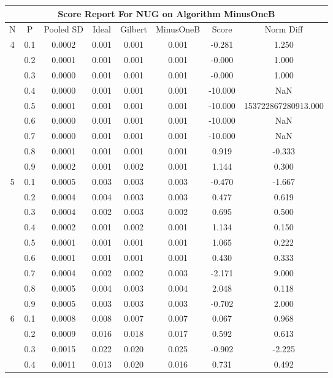 \documentclass[11pt,a4paper]{report}
\begin{document}
\begin{longtable}{ | c | c || c | c | c | c | c | c | }
\hline
\multicolumn{8}{|c|}{ Score Report For NUG on Algorithm MinusOneB} \\
\hline
N & P & Pooled SD &  Ideal &  Gilbert & MinusOneB  & Score & Norm Diff \\
 \hline
 \hline
 \endhead
\multirow{9}{*}{4} & 0.1 & 0.0002 & 0.001 & 0.001 & 0.001 & -0.281 & 1.250 \\
 & 0.2 & 0.0001 & 0.001 & 0.001 & 0.001 & -0.000 & 1.000 \\
 & 0.3 & 0.0000 & 0.001 & 0.001 & 0.001 & -0.000 & 1.000 \\
 & 0.4 & 0.0000 & 0.001 & 0.001 & 0.001 & -10.000 & NaN \\
 & 0.5 & 0.0001 & 0.001 & 0.001 & 0.001 & -10.000 & 153722867280913.000 \\
 & 0.6 & 0.0000 & 0.001 & 0.001 & 0.001 & -10.000 & NaN \\
 & 0.7 & 0.0000 & 0.001 & 0.001 & 0.001 & -10.000 & NaN \\
 & 0.8 & 0.0001 & 0.001 & 0.001 & 0.001 & 0.919 & -0.333 \\
 & 0.9 & 0.0002 & 0.001 & 0.002 & 0.001 & 1.144 & 0.300 \\
 \hline
\multirow{9}{*}{5} & 0.1 & 0.0005 & 0.003 & 0.003 & 0.003 & -0.470 & -1.667 \\
 & 0.2 & 0.0004 & 0.004 & 0.003 & 0.003 & 0.477 & 0.619 \\
 & 0.3 & 0.0004 & 0.002 & 0.003 & 0.002 & 0.695 & 0.500 \\
 & 0.4 & 0.0002 & 0.001 & 0.002 & 0.001 & 1.134 & 0.150 \\
 & 0.5 & 0.0001 & 0.001 & 0.001 & 0.001 & 1.065 & 0.222 \\
 & 0.6 & 0.0001 & 0.001 & 0.001 & 0.001 & 0.430 & 0.333 \\
 & 0.7 & 0.0004 & 0.002 & 0.002 & 0.003 & -2.171 & 9.000 \\
 & 0.8 & 0.0005 & 0.004 & 0.003 & 0.004 & 2.048 & 0.118 \\
 & 0.9 & 0.0005 & 0.003 & 0.003 & 0.003 & -0.702 & 2.000 \\
 \hline
\multirow{9}{*}{6} & 0.1 & 0.0008 & 0.008 & 0.007 & 0.007 & 0.067 & 0.968 \\
 & 0.2 & 0.0009 & 0.016 & 0.018 & 0.017 & 0.592 & 0.613 \\
 & 0.3 & 0.0015 & 0.022 & 0.020 & 0.025 & -0.902 & -2.225 \\
 & 0.4 & 0.0011 & 0.013 & 0.020 & 0.016 & 0.731 & 0.492 \\

\end{longtable}
\end{document}
